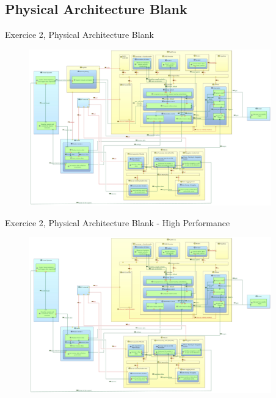 \documentclass[aspectratio=1610]{beamer}
\begin{document}
    \subsection{Physical Architecture Blank}
    \begin{frame}{Exercice 2, Physical Architecture Blank}
        \begin{figure}[H]
            \centering
            \includegraphics[width=\textwidth, height=6.75cm, keepaspectratio]{./images/EX2/CSC_5RO08_TA_EX2_PAB_Original.jpg}
        \end{figure}
    \end{frame}
    \begin{frame}{Exercice 2, Physical Architecture Blank - High Performance}
        \begin{figure}[H]
            \centering
            \includegraphics[width=\textwidth, height=6.75cm, keepaspectratio]{./images/EX2/CSC_5RO08_TA_EX2_PAB_High.jpg}
        \end{figure}
    \end{frame}
\end{document}
